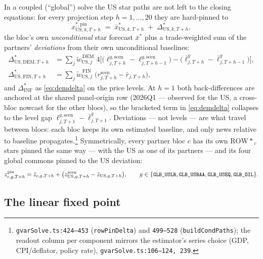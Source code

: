 \documentclass[11pt]{article}
\newcommand{\code}[1]{\texttt{\small #1}}
\begin{document}
In a coupled (``global'') solve the US star paths are not left to the closing equations: for every
projection step $h = 1, \dots, 20$ they are hard-pinned to
\begin{equation}\label{eq:starpin}
  x^{*,\mathrm{pin}}_{\mathrm{US},k,T+h}
  \;=\;
  \bar x^{*}_{\mathrm{US},k,T+h} \;+\; \Delta^{*}_{\mathrm{US},k,T+h},
\end{equation}
the bloc's own \emph{unconditional} star forecast $\bar x^{*}$ plus a trade-weighted sum of the
partners' \emph{deviations} from their own unconditional baselines:
\begin{align}
  \Delta^{*}_{\mathrm{US},\mathrm{DEM},T+h}
    &= \sum_{j} \tilde w^{\,\mathrm{DEM}}_{\mathrm{US},j}\; 4\Big[
        \big(\ell^{g,\mathrm{scen}}_{j,T+h} - \ell^{g,\mathrm{scen}}_{j,T+h-1}\big)
      - \big(\bar\ell^{g}_{j,T+h} - \bar\ell^{g}_{j,T+h-1}\big) \Big],
      \label{eq:demdelta}\\
  \Delta^{*}_{\mathrm{US},\mathrm{FIN},T+h}
    &= \sum_{j} \tilde w^{\,\mathrm{FIN}}_{\mathrm{US},j}\;
        \big( r^{\mathrm{scen}}_{j,T+h} - \bar r_{j,T+h} \big),
      \label{eq:findelta}
\end{align}
and $\Delta^{*}_{\mathrm{INF}}$ as \eqref{eq:demdelta} on the price levels. At $h=1$ both
back-differences are anchored at the shared panel-origin row (2026Q1 --- observed for the US, a
cross-bloc nowcast for the other blocs), so the bracketed term in \eqref{eq:demdelta} collapses to
the level gap $\ell^{g,\mathrm{scen}}_{j,T+1} - \bar\ell^{g}_{j,T+1}$. Deviations --- not levels --- are what travel
between blocs: each bloc keeps its own estimated baseline, and only news relative to baseline
propagates.\footnote{\code{gvarSolve.ts:424--453} (\code{rowPinDelta}) and \code{499--528}
(\code{buildCondPaths}); the readout column per component mirrors the estimator's series choice
(GDP, CPI/deflator, policy rate), \code{gvarSolve.ts:106--124, 239}.} Symmetrically, every partner
bloc $c$ has its own $\mathrm{ROW*}_{c}$ stars pinned the same way --- with the US as one of its
partners --- and its four global commons pinned to the US deviation:
\begin{equation}\label{eq:globpin}
  z^{\mathrm{pin}}_{c,g,T+h} = \bar z_{c,g,T+h}
    + \big( z^{\mathrm{scen}}_{\mathrm{US},g,T+h} - \bar z_{\mathrm{US},g,T+h} \big),
  \qquad g \in \{\code{GLB\_USLR}, \code{GLB\_USBAA}, \code{GLB\_USEQ}, \code{GLB\_OIL}\}.
\end{equation}

\subsection{The linear fixed point}
\end{document}
